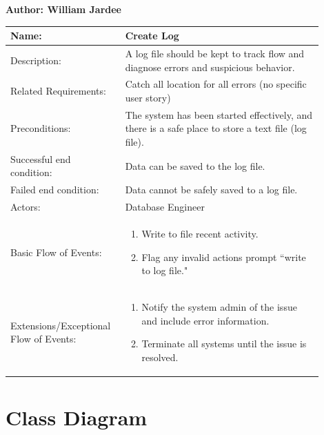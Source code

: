 \documentclass[11pt]{article}
\begin{document}
\begin{table}[!ht]
\begin{center}
\textbf{Author: William Jardee}
\vspace*{1em}

\begin{tabular}{p{0.30\linewidth}p{0.60\linewidth}}
	Name: & Create Log\\\hline
	Description: & A log file should be kept to track flow and diagnose errors and suspicious behavior.\\\hline
	Related Requirements:& Catch all location for all errors (no specific user story)\\\hline
	Preconditions:& The system has been started effectively, and there is a safe place to store a text file (log file).\\\hline
	Successful end condition:& Data can be saved to the log file.\\\hline
	Failed end condition:& Data cannot be safely saved to a log file.\\\hline
	Actors:& Database Engineer \\\hline
	Basic Flow of Events: & \begin{enumerate}
	\item Write to file recent activity.
	\item Flag any invalid actions prompt ``write to log file."
	\end{enumerate}\\\hline
	Extensions/Exceptional Flow of Events: & \begin{enumerate}
	\item Notify the system admin of the issue and include error information.
	\item Terminate all systems until the issue is resolved.
	\end{enumerate}
\end{tabular}
\label{des:create_log}
\end{center}
\end{table}

\clearpage



\section*{Class Diagram}
\end{document}
